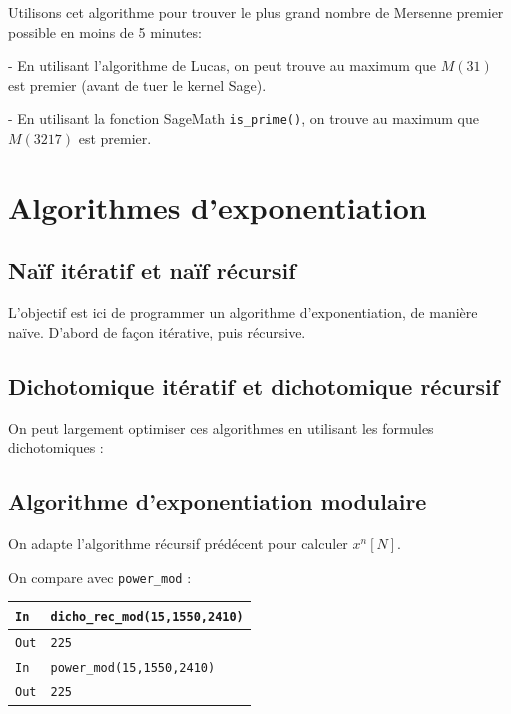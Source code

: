 \documentclass[titlepage]{article}
\begin{document}
    Utilisons cet algorithme pour trouver le plus grand nombre de Mersenne premier possible en moins de 5 minutes:

    - En utilisant l'algorithme de Lucas, on peut trouve au maximum que $M(31)$ est premier (avant de tuer le kernel Sage).

    - En utilisant la fonction SageMath \texttt{is\_prime()}, on trouve au maximum que $M(3217)$ est premier.

    \section{Algorithmes d'exponentiation}
    \subsection{Naïf itératif et naïf récursif}
    L'objectif est ici de programmer un algorithme d'exponentiation, de manière naïve. D'abord de façon itérative, puis récursive.

    

    

    \subsection{Dichotomique itératif et dichotomique récursif}

    On peut largement optimiser ces algorithmes en utilisant \- les formules dichotomiques : 

    

    

    \subsection{Algorithme d'exponentiation modulaire}
    On adapte l'algorithme récursif prédécent pour calculer $x^n [N]$.

    

    On compare avec \texttt{power\_mod} :\bigbreak

    \begin{tabularx}{12cm}{|p{0.60cm}|X|}
        \hline
        \rowcolor{gray}
        \texttt{In}
        & 
        \texttt{dicho\_rec\_mod(15,1550,2410)}
        \\
        \hline
        \texttt{Out}
        &
        \texttt{225}
        \\
        \hline
        \rowcolor{gray}
        \texttt{In}
        & 
        \texttt{power\_mod(15,1550,2410)}
        \\
        \hline
        \texttt{Out}
        &
        \texttt{225}
        \\
        \hline
    \end{tabularx}
    \bigbreak
\end{document}
